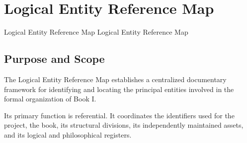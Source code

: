 %
%
%
%
%
%



\cleardoublepage
\chapter*{Logical Entity Reference Map}
{}

\markboth
    {Logical Entity Reference Map}
    {Logical Entity Reference Map}



\section*{Purpose and Scope}

The Logical Entity Reference Map establishes a centralized
documentary framework for identifying and locating the principal
entities involved in the formal organization of Book I.

Its primary function is referential. It coordinates the identifiers
used for the project, the book, its structural divisions, its
independently maintained assets, and its logical and philosophical
registers.

